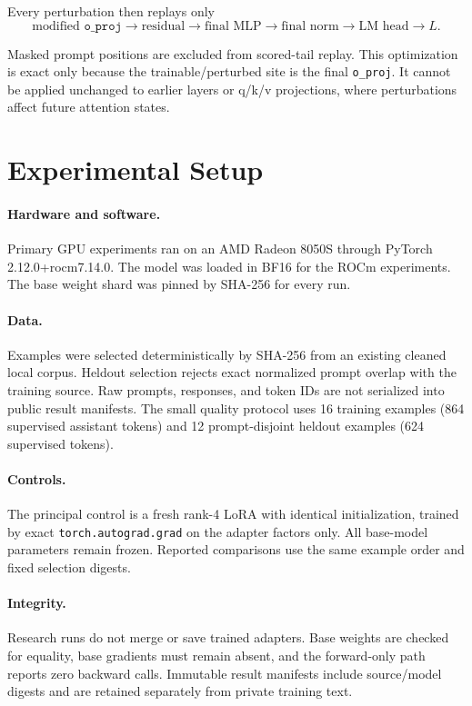 \documentclass[11pt]{article}
\newcommand{\oproj}{\texttt{o\_proj}}
\begin{document}
Every perturbation then replays only
\begin{equation}
\text{modified }\oproj{}
\rightarrow \text{residual}
\rightarrow \text{final MLP}
\rightarrow \text{final norm}
\rightarrow \text{LM head}
\rightarrow L.
\end{equation}

Masked prompt positions are excluded from scored-tail replay. This
optimization is exact only because the trainable/perturbed site is the final
\oproj{}. It cannot be applied unchanged to earlier layers or q/k/v
projections, where perturbations affect future attention states.

\section{Experimental Setup}

\paragraph{Hardware and software.}
Primary GPU experiments ran on an AMD Radeon 8050S through PyTorch
2.12.0+rocm7.14.0. The model was loaded in BF16 for the ROCm experiments.
The base weight shard was pinned by SHA-256 for every run.

\paragraph{Data.}
Examples were selected deterministically by SHA-256 from an existing cleaned
local corpus. Heldout selection rejects exact normalized prompt overlap with
the training source. Raw prompts, responses, and token IDs are not serialized
into public result manifests. The small quality protocol uses 16 training
examples (864 supervised assistant tokens) and 12 prompt-disjoint heldout
examples (624 supervised tokens).

\paragraph{Controls.}
The principal control is a fresh rank-4 LoRA with identical initialization,
trained by exact \texttt{torch.autograd.grad} on the adapter factors only.
All base-model parameters remain frozen. Reported comparisons use the same
example order and fixed selection digests.

\paragraph{Integrity.}
Research runs do not merge or save trained adapters. Base weights are checked
for equality, base gradients must remain absent, and the forward-only path
reports zero backward calls. Immutable result manifests include source/model
digests and are retained separately from private training text.
\end{document}
